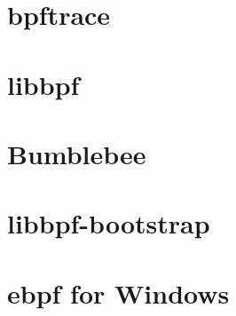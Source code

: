 
\section{bpftrace}


\section{libbpf}







\section{Bumblebee}


\section{libbpf-bootstrap}



\section{ebpf for Windows}



